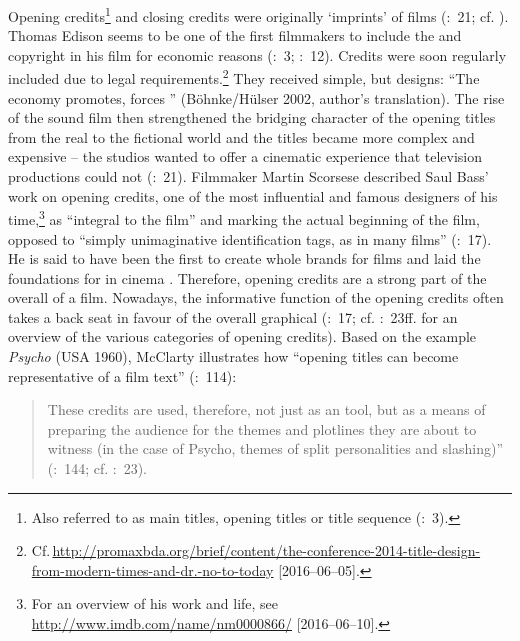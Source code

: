 Opening credits\footnote{Also referred to as main titles, opening titles or title sequence (\citealt{Hausberger2006}:~3).} and closing credits were originally ‘imprints’ of films (\citealt{Hausberger2006}:~21; cf. \citealt{mccort2002}). Thomas Edison seems to be one of the first filmmakers to include the  and copyright in his film for economic reasons (\citealt{Hausberger2006}:~3; \citealt{quitsch2010}:~12). Credits were soon regularly included due to legal requirements.\footnote{Cf.\,\url{http://promaxbda.org/brief/content/the-conference-2014-title-design-from-modern-times-and-dr.-no-to-today} [2016--06--05].} They received simple, but  designs: “The economy promotes, forces ” (Böhnke/Hülser 2002, author’s translation). The rise of the sound film then strengthened the bridging character of the opening titles from the real to the fictional world and the titles became more complex and expensive – the studios wanted to offer a cinematic experience that television productions could not (\citealt{quitsch2010}:~21). Filmmaker Martin Scorsese described Saul Bass’ work on opening credits, one of the most influential and famous designers of his time,\footnote{For an overview of his work and life, see \url{http://www.imdb.com/name/nm0000866/} [2016--06--10].} as “integral to the film” and marking the actual beginning of the film, opposed to “simply unimaginative identification tags, as in many films” (\citealt{meggs1997}:~17). He is said to have been the first  to create whole brands for films and laid the foundations for  in cinema \citep{Althen2006}. Therefore, opening credits are a strong part of the overall  of a film. Nowadays, the informative function of the opening credits often takes a back seat in favour of the overall graphical  (\citealt{Hausberger2006}:~17; cf. \citealt{Hausberger2006}:~23ff. for an overview of the various categories of opening credits). Based on the example \textit{Psycho} (USA 1960), McClarty illustrates how “opening titles can become representative of a film text” (\citeyear{mcclarty2012}:~114):
\begin{quote}
These credits are used, therefore, not just as an  tool, but as a means of preparing the audience for the themes and plotlines they are about to witness (in the case of Psycho, themes of split personalities and slashing)” (\citealt{mcclarty2012}:~144; cf. \citealt{Dick2005}:~23).
\end{quote}
